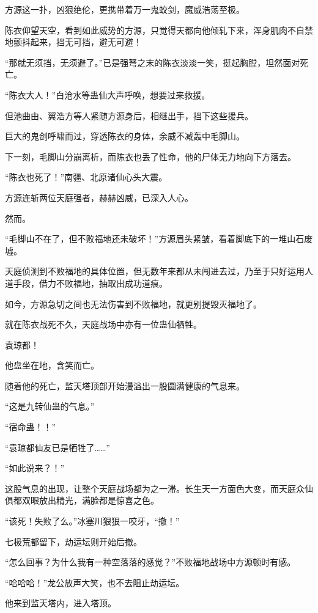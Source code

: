 
\begin{this_body}

方源这一扑，凶狠绝伦，更携带着万一鬼蛟剑，魔威浩荡至极。

陈衣仰望天空，看到如此威势的方源，只觉得天都向他倾轧下来，浑身肌肉不自禁地颤抖起来，挡无可挡，避无可避！

“那就无须挡，无须避了。”已是强弩之末的陈衣淡淡一笑，挺起胸膛，坦然面对死亡。

“陈衣大人！”白沧水等蛊仙大声呼唤，想要过来救援。

但池曲由、翼浩方等人紧随方源身后，相继出手，挡下这些援兵。

巨大的鬼剑呼啸而过，穿透陈衣的身体，余威不减轰中毛脚山。

下一刻，毛脚山分崩离析，而陈衣也丢了性命，他的尸体无力地向下方落去。

“陈衣也死了！”南疆、北原诸仙心头大震。

方源连斩两位天庭强者，赫赫凶威，已深入人心。

然而。

“毛脚山不在了，但不败福地还未破坏！”方源眉头紧皱，看着脚底下的一堆山石废墟。

天庭侦测到不败福地的具体位置，但无数年来都从未闯进去过，乃至于只好运用人道手段，借力不败福地，抽取出成功道痕。

如今，方源急切之间也无法伤害到不败福地，就更别提毁灭福地了。

就在陈衣战死不久，天庭战场中亦有一位蛊仙牺牲。

袁琼都！

他盘坐在地，含笑而亡。

随着他的死亡，监天塔顶部开始漫溢出一股圆满健康的气息来。

“这是九转仙蛊的气息。”

“宿命蛊！！”

“袁琼都仙友已是牺牲了……”

“如此说来？！”

这股气息的出现，让整个天庭战场都为之一滞。长生天一方面色大变，而天庭众仙俱都双眼放出精光，满脸都是惊喜之色。

“该死！失败了么。”冰塞川狠狠一咬牙，“撤！”

七极荒都留下，劫运坛则开始后撤。

“怎么回事？为什么我有一种空落落的感觉？”不败福地战场中方源顿时有感。

“哈哈哈！”龙公放声大笑，也不去阻止劫运坛。

他来到监天塔内，进入塔顶。


\end{this_body}
